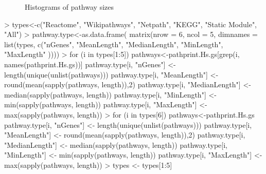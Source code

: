 \documentclass{article}
\renewenvironment{Schunk}{\vspace{\topsep}}{\vspace{\topsep}}
\begin{document}
\begin{figure}
\begin{center}
\end{center}
\caption{Histograms of pathway sizes}
\label{fig:pathwaySizePlot}
\end{figure}

\begin{Schunk}
\begin{Sinput}
> types<-c("Reactome",
          "Wikipathways",
          "Netpath",
          "KEGG",
          "Static Module",
          "All")
> pathway.type<-as.data.frame(
   matrix(nrow = 6, ncol = 5,
   dimnames = list(types,
                   c("nGenes", "MeanLength",
                     "MedianLength", "MinLength", "MaxLength"
                     ))))
> for (i in types[1:5]){
   pathways<-pathprint.Hs.gs[grep(i, names(pathprint.Hs.gs))]
   pathway.type[i, "nGenes"] <- length(unique(unlist(pathways)))
   pathway.type[i, "MeanLength"] <- round(mean(sapply(pathways, length)),2)
   pathway.type[i, "MedianLength"] <- median(sapply(pathways, length))
   pathway.type[i, "MinLength"] <- min(sapply(pathways, length))
   pathway.type[i, "MaxLength"] <- max(sapply(pathways, length))
   }
> for (i in types[6]){
   pathways<-pathprint.Hs.gs
   pathway.type[i, "nGenes"] <- length(unique(unlist(pathways)))
   pathway.type[i, "MeanLength"] <- round(mean(sapply(pathways, length)),2)
   pathway.type[i, "MedianLength"] <- median(sapply(pathways, length))
   pathway.type[i, "MinLength"] <- min(sapply(pathways, length))
   pathway.type[i, "MaxLength"] <- max(sapply(pathways, length))
   }
> types <- types[1:5]
\end{Sinput}
\end{Schunk}
\end{document}

